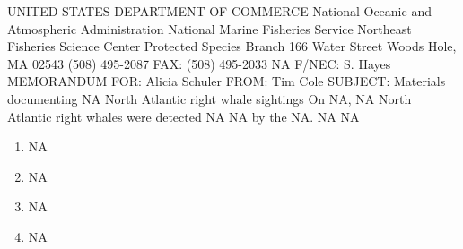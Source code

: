 \documentclass[
]{article}
\begin{document}
\begin{flushleft}
\vspace*{-30mm}
\hspace*{200pt}UNITED STATES DEPARTMENT OF COMMERCE\newline
\hspace*{200pt}National Oceanic and Atmospheric Administration\newline
\hspace*{200pt}National Marine Fisheries Service\newline
\hspace*{200pt}Northeast Fisheries Science Center\newline
\hspace*{200pt}Protected Species Branch\newline
\hspace*{200pt}166 Water Street\newline
\hspace*{200pt}Woods Hole, MA 02543\newline
\newline
\hspace*{200pt}(508) 495-2087 \hspace{75pt} FAX: (508) 495-2033\newline
\newline
\hspace*{198pt} NA \hspace{74pt} F/NEC: S. Hayes\newline
\newline
\newline
MEMORANDUM FOR: \hspace*{28pt} Alicia Schuler\newline
                  \hspace*{141pt}{\it Shipping Liaison, GARFO}\newline
\newline
FROM:   \hspace*{101pt} Tim Cole\newline
      \hspace*{141pt}{\it Protected Species Branch, NEFSC}\newline
\newline
SUBJECT: \hspace*{87pt} Materials documenting NA North Atlantic right whale sightings\newline 
\newline
On NA, NA North Atlantic right whales were detected NA NA by the NA.  NA\newline
\newline
NA
\begin{enumerate}
    \item \quad NA
    \item   \quad NA
  \item \quad NA
  \item \quad NA
\end{enumerate}









\end{flushleft}
\end{document}
